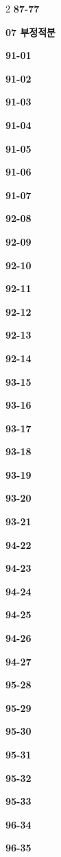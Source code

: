 \documentclass[10pt,a4paper]{article}
\begin{document}
\begin{multicols}{2}
\noindent\textbf{87-77}\ \par
\noindent\textbf{07 부정적분}\par\smallskip
\noindent\textbf{91-01}\ \par
\noindent\textbf{91-02}\ \par
\noindent\textbf{91-03}\ \par
\noindent\textbf{91-04}\ \par
\noindent\textbf{91-05}\ \par
\noindent\textbf{91-06}\ \par
\noindent\textbf{91-07}\ \par
\noindent\textbf{92-08}\ \par
\noindent\textbf{92-09}\ \par
\noindent\textbf{92-10}\ \par
\noindent\textbf{92-11}\ \par
\noindent\textbf{92-12}\ \par
\noindent\textbf{92-13}\ \par
\noindent\textbf{92-14}\ \par
\noindent\textbf{93-15}\ \par
\noindent\textbf{93-16}\ \par
\noindent\textbf{93-17}\ \par
\noindent\textbf{93-18}\ \par
\noindent\textbf{93-19}\ \par
\noindent\textbf{93-20}\ \par
\noindent\textbf{93-21}\ \par
\noindent\textbf{94-22}\ \par
\noindent\textbf{94-23}\ \par
\noindent\textbf{94-24}\ \par
\noindent\textbf{94-25}\ \par
\noindent\textbf{94-26}\ \par
\noindent\textbf{94-27}\ \par
\noindent\textbf{95-28}\ \par
\noindent\textbf{95-29}\ \par
\noindent\textbf{95-30}\ \par
\noindent\textbf{95-31}\ \par
\noindent\textbf{95-32}\ \par
\noindent\textbf{95-33}\ \par
\noindent\textbf{96-34}\ \par
\noindent\textbf{96-35}\ \par

\end{multicols}
\end{document}
